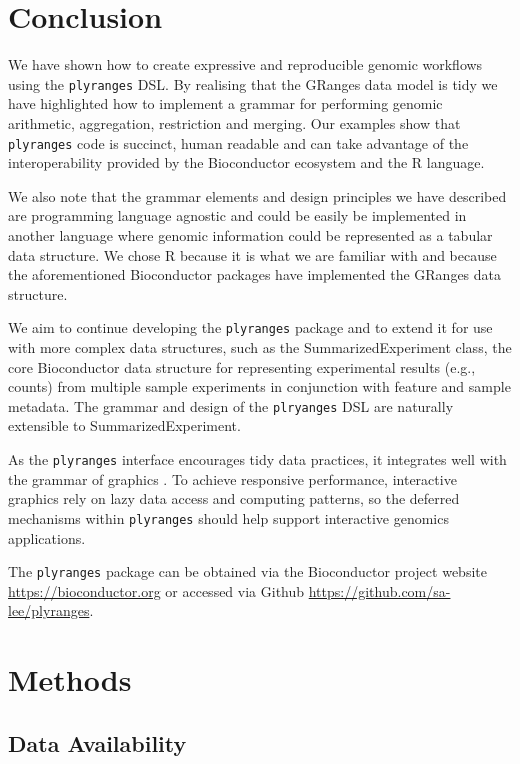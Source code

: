 \documentclass[]{article}
\begin{document}
\hypertarget{conclusion}{%
\section{Conclusion}\label{conclusion}}

We have shown how to create expressive and reproducible genomic
workflows using the \texttt{plyranges} DSL. By realising that the
GRanges data model is tidy we have highlighted how to implement a
grammar for performing genomic arithmetic, aggregation, restriction and
merging. Our examples show that \texttt{plyranges} code is succinct,
human readable and can take advantage of the interoperability provided
by the Bioconductor ecosystem and the R language.

We also note that the grammar elements and design principles we have
described are programming language agnostic and could be easily be
implemented in another language where genomic information could be
represented as a tabular data structure. We chose R because it is what
we are familiar with and because the aforementioned Bioconductor
packages have implemented the GRanges data structure.

We aim to continue developing the \texttt{plyranges} package and to
extend it for use with more complex data structures, such as the
SummarizedExperiment class, the core Bioconductor data structure for
representing experimental results (e.g., counts) from multiple sample
experiments in conjunction with feature and sample metadata. The grammar
and design of the \texttt{plryanges} DSL are naturally extensible to
SummarizedExperiment.

As the \texttt{plyranges} interface encourages tidy data practices, it
integrates well with the grammar of graphics \cite{Wickham2016-gz}. To
achieve responsive performance, interactive graphics rely on lazy data
access and computing patterns, so the deferred mechanisms within
\texttt{plyranges} should help support interactive genomics
applications.

The \texttt{plyranges} package can be obtained via the Bioconductor
project website \url{https://bioconductor.org} or accessed via Github
\url{https://github.com/sa-lee/plyranges}.

\hypertarget{methods}{%
\section{Methods}\label{methods}}

\hypertarget{data-availability}{%
\subsection{Data Availability}\label{data-availability}}
\end{document}
